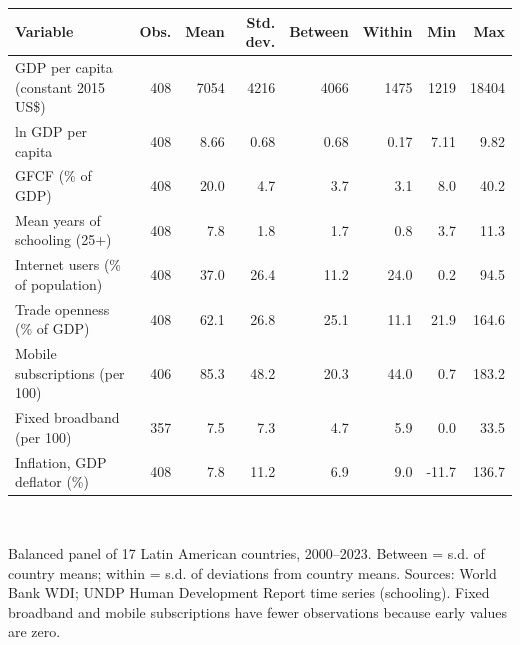 \begin{tabular}{lrrrrrrr}\toprule
Variable & Obs. & Mean & Std. dev. & Between & Within & Min & Max \\
\midrule
GDP per capita (constant 2015 US\$) & 408 & 7054 & 4216 & 4066 & 1475 & 1219 & 18404 \\
ln GDP per capita & 408 & 8.66 & 0.68 & 0.68 & 0.17 & 7.11 & 9.82 \\
GFCF (\% of GDP) & 408 & 20.0 & 4.7 & 3.7 & 3.1 & 8.0 & 40.2 \\
Mean years of schooling (25+) & 408 & 7.8 & 1.8 & 1.7 & 0.8 & 3.7 & 11.3 \\
Internet users (\% of population) & 408 & 37.0 & 26.4 & 11.2 & 24.0 & 0.2 & 94.5 \\
Trade openness (\% of GDP) & 408 & 62.1 & 26.8 & 25.1 & 11.1 & 21.9 & 164.6 \\
Mobile subscriptions (per 100) & 406 & 85.3 & 48.2 & 20.3 & 44.0 & 0.7 & 183.2 \\
Fixed broadband (per 100) & 357 & 7.5 & 7.3 & 4.7 & 5.9 & 0.0 & 33.5 \\
Inflation, GDP deflator (\%) & 408 & 7.8 & 11.2 & 6.9 & 9.0 & -11.7 & 136.7 \\
\bottomrule\end{tabular}
\\[3pt]\begin{minipage}{\tablewidth}\footnotesize Balanced panel of 17 Latin American countries, 2000--2023. Between = s.d. of country means; within = s.d. of deviations from country means. Sources: World Bank WDI; UNDP Human Development Report time series (schooling). Fixed broadband and mobile subscriptions have fewer observations because early values are zero.\end{minipage}
